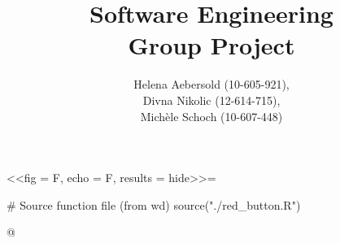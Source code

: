 \documentclass[11pt,a4paper]{report}
\begin{document}
\title{\textbf{Software Engineering} \\ \vspace{40pt} Group Project}
\author{Helena Aebersold (10-605-921), \\ Divna Nikolic (12-614-715), \\ Michèle Schoch (10-607-448)}
\maketitle


<<fig = F, echo = F, results = hide>>=

# Source function file (from wd)
source("./red_button.R")

@



\newpage
\end{document}
